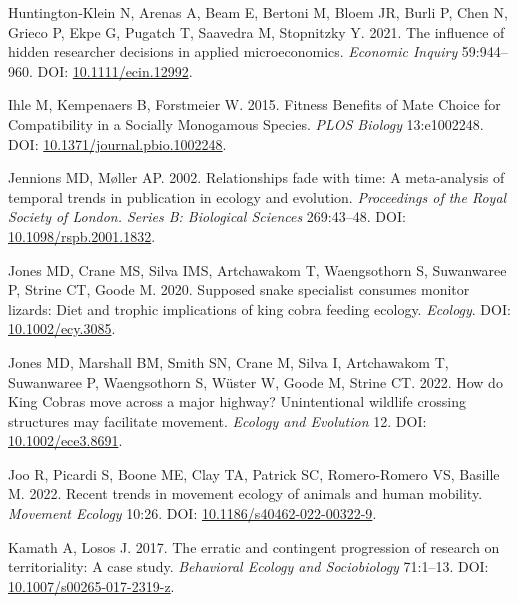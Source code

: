 \documentclass[10pt,a4paper]{article}
\newlength{\cslhangindent}
\newenvironment{CSLReferences}[2] %
 {\begin{list}{}{%
  \setlength{\itemindent}{0pt}
  \setlength{\leftmargin}{0pt}
  \setlength{\parsep}{0pt}
  \ifodd #1
   \setlength{\leftmargin}{\cslhangindent}
   \setlength{\itemindent}{-1\cslhangindent}
  \fi
  \setlength{\itemsep}{#2\baselineskip}}}
 {\end{list}}
\begin{document}
\begin{CSLReferences}{1}{0}
Huntington‐Klein N, Arenas A, Beam E, Bertoni M, Bloem JR, Burli P, Chen N, Grieco P, Ekpe G, Pugatch T, Saavedra M, Stopnitzky Y. 2021. The influence of hidden researcher decisions in applied microeconomics. \emph{Economic Inquiry} 59:944--960. DOI: \href{https://doi.org/10.1111/ecin.12992}{10.1111/ecin.12992}.

Ihle M, Kempenaers B, Forstmeier W. 2015. Fitness {Benefits} of {Mate} {Choice} for {Compatibility} in a {Socially} {Monogamous} {Species}. \emph{PLOS Biology} 13:e1002248. DOI: \href{https://doi.org/10.1371/journal.pbio.1002248}{10.1371/journal.pbio.1002248}.

Jennions MD, Møller AP. 2002. Relationships fade with time: A meta-analysis of temporal trends in publication in ecology and evolution. \emph{Proceedings of the Royal Society of London. Series B: Biological Sciences} 269:43--48. DOI: \href{https://doi.org/10.1098/rspb.2001.1832}{10.1098/rspb.2001.1832}.

Jones MD, Crane MS, Silva IMS, Artchawakom T, Waengsothorn S, Suwanwaree P, Strine CT, Goode M. 2020. Supposed snake specialist consumes monitor lizards: Diet and trophic implications of king cobra feeding ecology. \emph{Ecology}. DOI: \href{https://doi.org/10.1002/ecy.3085}{10.1002/ecy.3085}.

Jones MD, Marshall BM, Smith SN, Crane M, Silva I, Artchawakom T, Suwanwaree P, Waengsothorn S, Wüster W, Goode M, Strine CT. 2022. How do {King} {Cobras} move across a major highway? {Unintentional} wildlife crossing structures may facilitate movement. \emph{Ecology and Evolution} 12. DOI: \href{https://doi.org/10.1002/ece3.8691}{10.1002/ece3.8691}.

Joo R, Picardi S, Boone ME, Clay TA, Patrick SC, Romero-Romero VS, Basille M. 2022. Recent trends in movement ecology of animals and human mobility. \emph{Movement Ecology} 10:26. DOI: \href{https://doi.org/10.1186/s40462-022-00322-9}{10.1186/s40462-022-00322-9}.

Kamath A, Losos J. 2017. The erratic and contingent progression of research on territoriality: A case study. \emph{Behavioral Ecology and Sociobiology} 71:1--13. DOI: \href{https://doi.org/10.1007/s00265-017-2319-z}{10.1007/s00265-017-2319-z}.


\end{CSLReferences}
\end{document}
